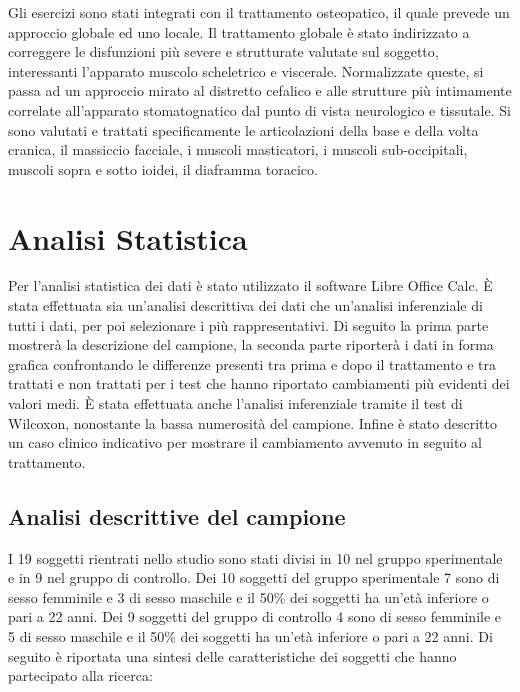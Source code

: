 Gli esercizi sono stati integrati con il trattamento osteopatico, il quale prevede un approccio globale ed uno locale. Il trattamento globale è stato indirizzato a correggere le disfunzioni più severe e strutturate valutate sul soggetto, interessanti l’apparato muscolo scheletrico e viscerale. Normalizzate queste, si passa ad un approccio mirato al distretto cefalico e alle strutture più intimamente correlate all’apparato stomatognatico dal punto di vista neurologico e tissutale. Si sono valutati e trattati specificamente le articolazioni della base e della volta cranica, il massiccio facciale, i muscoli masticatori, i muscoli sub-occipitali, muscoli sopra e sotto ioidei, il diaframma toracico.



\section{Analisi Statistica}

Per l’analisi statistica dei dati è stato utilizzato il software Libre Office Calc. È stata effettuata sia un’analisi descrittiva dei dati che un’analisi inferenziale di tutti i dati, per poi selezionare i più rappresentativi. Di seguito la prima parte mostrerà la descrizione del campione, la seconda parte riporterà i dati in forma grafica confrontando le differenze presenti tra prima e dopo il trattamento e tra trattati e non trattati per i test che hanno riportato cambiamenti più evidenti dei valori medi. È stata effettuata anche l’analisi inferenziale tramite il test di Wilcoxon, nonostante la bassa numerosità del campione. Infine è stato descritto un caso clinico indicativo per mostrare il cambiamento avvenuto in seguito al trattamento.

\subsection{Analisi descrittive del campione}

I 19 soggetti rientrati nello studio sono stati divisi in 10 nel gruppo sperimentale e in 9 nel gruppo di controllo. Dei 10 soggetti del gruppo sperimentale 7 sono di sesso femminile e 3 di sesso maschile e il 50\% dei soggetti ha un’età inferiore o pari a 22 anni. Dei 9 soggetti del gruppo di controllo 4 sono di sesso femminile e 5 di sesso maschile e il 50\% dei soggetti ha un’età inferiore o pari a 22 anni. Di seguito è riportata una sintesi delle caratteristiche dei soggetti che hanno partecipato alla ricerca:

